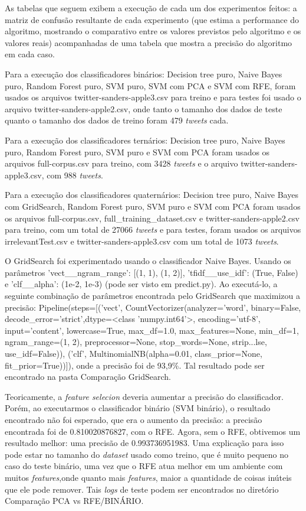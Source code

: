 As tabelas que seguem exibem a execução de cada um dos experimentos feitos: a matriz de confusão resultante de cada experimento (que estima a performance do algoritmo, mostrando o comparativo entre os valores previstos pelo algoritmo e os valores reais) acompanhadas de uma tabela que mostra a precisão do algoritmo em cada caso.

Para a execução dos classificadores binários:  Decision tree puro, Naive Bayes puro, Random Forest puro, SVM puro, SVM com PCA e SVM com RFE, foram usados os arquivos twitter-sanders-apple3.csv para treino e para testes foi usado o arquivo twitter-sanders-apple2.csv, onde tanto o tamanho dos dados de teste quanto o tamanho dos dados de treino foram 479 \emph{tweets} cada.

Para a execução dos classificadores ternários: Decision tree puro, Naive Bayes puro, Random Forest puro, SVM puro e SVM com PCA foram usados os arquivos full-corpus.csv para treino, com 3428 \emph{tweets} e o arquivo twitter-sanders-apple3.csv, com 988 \emph{tweets}.

Para a execução dos classificadores quaternários: Decision tree puro, Naive Bayes com GridSearch, Random Forest puro, SVM puro e SVM com PCA foram usados os arquivos full-corpus.csv, full\_training\_dataset.csv e twitter-sanders-apple2.csv para treino, com um total de 27066 \emph{tweets} e para testes, foram usados os arquivos irrelevantTest.csv e twitter-sanders-apple3.csv com um total de 1073 \emph{tweets}.

O GridSearch foi experimentado usando o classificador Naive Bayes. Usando  os parâmetros 'vect\_\_ngram\_range': [(1, 1), (1, 2)],
'tfidf\_\_use\_idf': (True, False) e 'clf\_\_alpha': (1e-2, 1e-3) (pode ser visto em predict.py). Ao executá-lo, a seguinte combinação de parâmetros encontrada pelo GridSearch que maximizou a precisão: Pipeline(steps=[('vect', CountVectorizer(analyzer='word', binary=False, decode\_error='strict',dtype=<class 'numpy.int64'>, encoding='utf-8', input='content',
        lowercase=True, max\_df=1.0, max\_features=None, min\_df=1,
        ngram\_range=(1, 2), preprocessor=None, stop\_words=None,
        strip...lse,
         use\_idf=False)), ('clf', MultinomialNB(alpha=0.01, class\_prior=None, fit\_prior=True))]), onde a precisão foi de 93,9\%. Tal resultado pode ser encontrado na pasta Comparação GridSearch.

Teoricamente, a \emph{feature selecion} deveria aumentar a precisão do classificador. Porém, ao executarmos o classificador binário (SVM binário), o resultado encontrado não foi esperado, que era o aumento da precisão: a precisão encontrada foi de 0.810020876827, com o RFE. Agora, sem o RFE, obtivemos um resultado melhor: uma precisão de 0.993736951983. Uma explicação para isso pode estar no tamanho do \emph{dataset} usado como treino, que é muito pequeno no caso do teste binário, uma vez que o RFE atua melhor em um ambiente com muitos \emph{features},onde quanto mais \emph{features}, maior a quantidade de coisas inúteis que ele pode remover. Tais \emph{logs} de teste podem ser encontrados no diretório Comparação PCA vs RFE/BINÁRIO.

